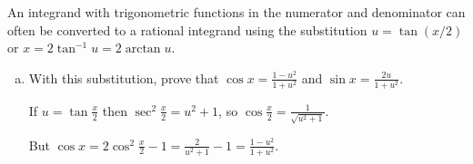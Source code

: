 \documentclass{agony}
\begin{document}
\begin{prob}
  An integrand with trigonometric functions in the numerator and denominator
  can often be converted to a rational integrand using the substitution
  $u = \tan(x/2)$ or $x = 2\tan^{-1} u = 2 \arctan u$.
\end{prob}
\begin{enumerate}[(a)]
  \item With this substitution,
        prove that $\cos x = \frac{1-u^2}{1+u^2}$ and $\sin x = \frac{2u}{1+u^2}$.
        \begin{prf}
          If $u = \tan\frac{x}{2}$ then $\sec^2\frac{x}{2} = u^2 + 1$,
          so $\cos\frac{x}{2} = \frac{1}{\sqrt{u^2+1}}$.

          But $\cos x = 2\cos^2\frac{x}{2} - 1 = \frac{2}{u^2+1} - 1 = \frac{1-u^2}{1+u^2}$.


\end{prf}
\end{enumerate}
\end{document}
